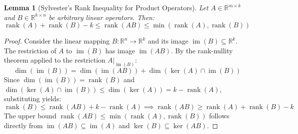 \documentclass{article}
\newtheorem{lemma}{Lemma}
\begin{document}
\begin{lemma}[Sylvester's Rank Inequality for Product Operators]
\label{lem:sylvester}
Let $A \in \mathbb{R}^{m \times k}$ and $B \in \mathbb{R}^{k \times n}$ be arbitrary linear operators. Then:
\begin{equation}
    \operatorname{rank}(A) + \operatorname{rank}(B) - k \le \operatorname{rank}(A B) \le \min(\operatorname{rank}(A), \operatorname{rank}(B))
\end{equation}
\end{lemma}
\begin{proof}
Consider the linear mapping $B: \mathbb{R}^n \to \mathbb{R}^k$ and its image $\operatorname{im}(B) \subseteq \mathbb{R}^k$. The restriction of $A$ to $\operatorname{im}(B)$ has image $\operatorname{im}(A B)$. By the rank-nullity theorem applied to the restriction $A|_{\operatorname{im}(B)}$:
\begin{equation}
    \operatorname{dim}(\operatorname{im}(B)) = \operatorname{dim}(\operatorname{im}(A B)) + \operatorname{dim}(\ker(A) \cap \operatorname{im}(B))
\end{equation}
Since $\operatorname{dim}(\operatorname{im}(B)) = \operatorname{rank}(B)$ and $\operatorname{dim}(\ker(A) \cap \operatorname{im}(B)) \le \operatorname{dim}(\ker(A)) = k - \operatorname{rank}(A)$, substituting yields:
\begin{equation}
    \operatorname{rank}(B) \le \operatorname{rank}(A B) + k - \operatorname{rank}(A) \implies \operatorname{rank}(A B) \ge \operatorname{rank}(A) + \operatorname{rank}(B) - k
\end{equation}
The upper bound $\operatorname{rank}(A B) \le \min(\operatorname{rank}(A), \operatorname{rank}(B))$ follows directly from $\operatorname{im}(A B) \subseteq \operatorname{im}(A)$ and $\ker(B) \subseteq \ker(A B)$.
\end{proof}
\end{document}

